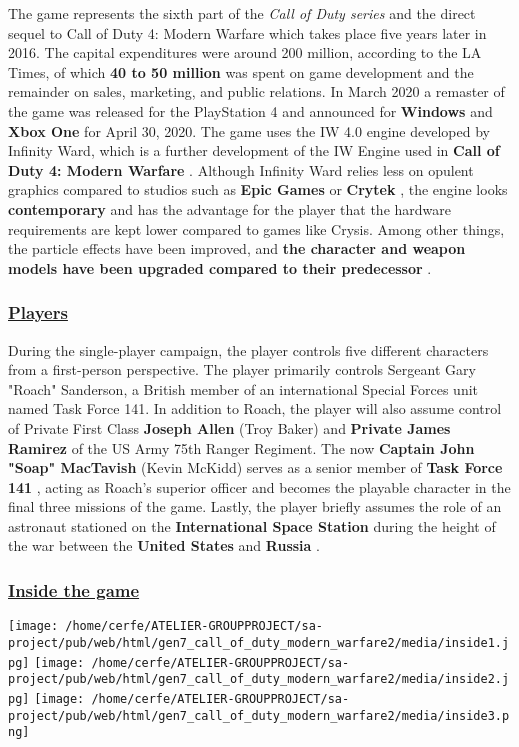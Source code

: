 \documentclass[a4paper,10pt]{book}
\begin{document}
          The game represents the sixth part of the  \textit{Call of Duty series } and the direct sequel to Call of Duty 4: Modern Warfare
          which takes place five years later in 2016. The capital expenditures were around  200 million, according to the LA
          Times, of which  \textbf{40 to 50 million }  was spent on game development and the remainder on sales, marketing, and public
          relations.
          In March 2020 a remaster of the game was released for the PlayStation 4 and announced for  \textbf{Windows }  and  \textbf{Xbox One } 
          for April 30, 2020.
          The game uses the IW 4.0 engine developed by Infinity Ward, which is a further development of the IW Engine
          used in  \textbf{Call of Duty 4: Modern Warfare } .  
          Although Infinity Ward relies less on opulent graphics compared to studios such as  \textbf{Epic Games }  or  \textbf{Crytek } , the engine looks  \textbf{contemporary }  and has the advantage for the player that the hardware
          requirements are kept lower compared to games like Crysis. Among other things, the particle effects have been
          improved, and  \textbf{the character and weapon models have been upgraded compared to their predecessor } .
         
 \subsubsection{\underline{Players }}
 
        During the single-player campaign, the player controls five different characters from a first-person perspective.
        The player primarily controls Sergeant Gary "Roach" Sanderson, a British member of an international Special Forces unit named Task Force 141.
        In addition to Roach, the player will also assume control of Private First Class  \textbf{Joseph Allen }  (Troy Baker) and  \textbf{Private James Ramirez }  of the US Army 75th Ranger Regiment. 
        The now  \textbf{Captain John "Soap" MacTavish }  (Kevin McKidd) serves as a senior member of  \textbf{Task Force 141 } , acting as Roach's superior officer and becomes the playable character in the final three missions of the game. 
        Lastly, the player briefly assumes the role of an astronaut stationed on the  \textbf{International Space Station }  during the height of the war between the  \textbf{United States }  and  \textbf{Russia } .
         
 \subsubsection{\underline{Inside the game }}
 \texttt{[image: /home/cerfe/ATELIER-GROUPPROJECT/sa-project/pub/web/html/gen7\_call\_of\_duty\_modern\_warfare2/media/inside1.jpg]}
 \texttt{[image: /home/cerfe/ATELIER-GROUPPROJECT/sa-project/pub/web/html/gen7\_call\_of\_duty\_modern\_warfare2/media/inside2.jpg]}
 \texttt{[image: /home/cerfe/ATELIER-GROUPPROJECT/sa-project/pub/web/html/gen7\_call\_of\_duty\_modern\_warfare2/media/inside3.png]}
\end{document}
